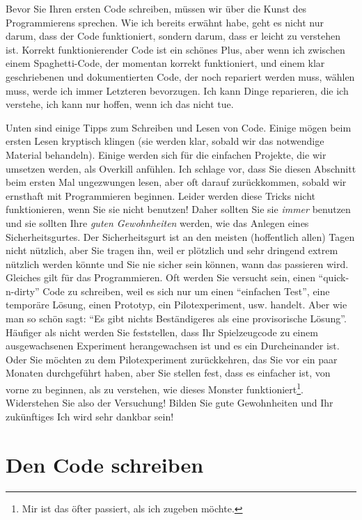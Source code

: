 \documentclass[
]{book}
\begin{document}
Bevor Sie Ihren ersten Code schreiben, müssen wir über die Kunst des Programmierens sprechen. Wie ich bereits erwähnt habe, geht es nicht nur darum, dass der Code funktioniert, sondern darum, dass er leicht zu verstehen ist. Korrekt funktionierender Code ist ein schönes Plus, aber wenn ich zwischen einem Spaghetti-Code, der momentan korrekt funktioniert, und einem klar geschriebenen und dokumentierten Code, der noch repariert werden muss, wählen muss, werde ich immer Letzteren bevorzugen. Ich kann Dinge reparieren, die ich verstehe, ich kann nur hoffen, wenn ich das nicht tue.

Unten sind einige Tipps zum Schreiben und Lesen von Code. Einige mögen beim ersten Lesen kryptisch klingen (sie werden klar, sobald wir das notwendige Material behandeln). Einige werden sich für die einfachen Projekte, die wir umsetzen werden, als Overkill anfühlen. Ich schlage vor, dass Sie diesen Abschnitt beim ersten Mal ungezwungen lesen, aber oft darauf zurückkommen, sobald wir ernsthaft mit Programmieren beginnen. Leider werden diese Tricks nicht funktionieren, wenn Sie sie nicht benutzen! Daher sollten Sie sie \emph{immer} benutzen und sie sollten Ihre \emph{guten Gewohnheiten} werden, wie das Anlegen eines Sicherheitsgurtes. Der Sicherheitsgurt ist an den meisten (hoffentlich allen) Tagen nicht nützlich, aber Sie tragen ihn, weil er plötzlich und sehr dringend extrem nützlich werden könnte und Sie nie sicher sein können, wann das passieren wird. Gleiches gilt für das Programmieren. Oft werden Sie versucht sein, einen ``quick-n-dirty'' Code zu schreiben, weil es sich nur um einen ``einfachen Test'', eine temporäre Lösung, einen Prototyp, ein Pilotexperiment, usw. handelt. Aber wie man so schön sagt: ``Es gibt nichts Beständigeres als eine provisorische Lösung''. Häufiger als nicht werden Sie feststellen, dass Ihr Spielzeugcode zu einem ausgewachsenen Experiment herangewachsen ist und es ein Durcheinander ist. Oder Sie möchten zu dem Pilotexperiment zurückkehren, das Sie vor ein paar Monaten durchgeführt haben, aber Sie stellen fest, dass es einfacher ist, von vorne zu beginnen, als zu verstehen, wie dieses Monster funktioniert\footnote{Mir ist das öfter passiert, als ich zugeben möchte.}. Widerstehen Sie also der Versuchung! Bilden Sie gute Gewohnheiten und Ihr zukünftiges Ich wird sehr dankbar sein!

\hypertarget{schreibtipps}{%
\section{Den Code schreiben}\label{schreibtipps}}
\end{document}
